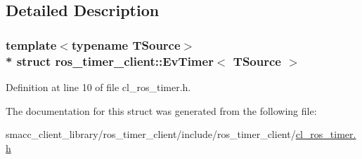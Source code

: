 \subsection{Detailed Description}
\subsubsection*{template$<$typename T\+Source$>$\\*
struct ros\+\_\+timer\+\_\+client\+::\+Ev\+Timer$<$ T\+Source $>$}



Definition at line 10 of file cl\+\_\+ros\+\_\+timer.\+h.



The documentation for this struct was generated from the following file\+:\begin{DoxyCompactItemize}
\item 
smacc\+\_\+client\+\_\+library/ros\+\_\+timer\+\_\+client/include/ros\+\_\+timer\+\_\+client/\hyperlink{cl__ros__timer_8h}{cl\+\_\+ros\+\_\+timer.\+h}\end{DoxyCompactItemize}
